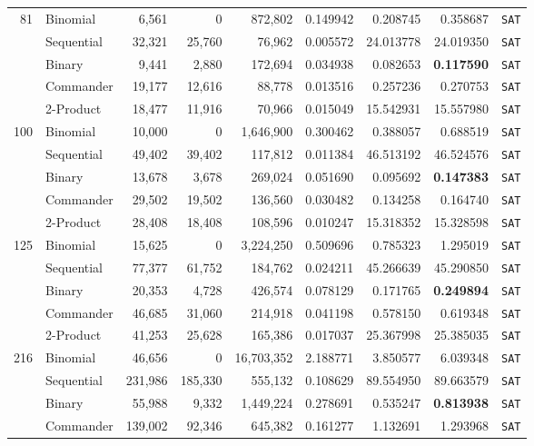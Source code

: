 \documentclass[a4paper,fleqn]{cas-sc}
\begin{document}
\begin{table}[t]
\begin{tabular*}{\textwidth}{@{\extracolsep{\fill}} r l r r r r r r c @{}}
\midrule
\multirow{5}{*}{81} 
 & Binomial & 6,561 & 0 & 872,802 & 0.149942 & 0.208745 & 0.358687 & \texttt{SAT} \\
 & Sequential & 32,321 & 25,760 & 76,962 & 0.005572 & 24.013778 & 24.019350 & \texttt{SAT} \\
 & Binary & 9,441 & 2,880 & 172,694 & 0.034938 & 0.082653 & \textbf{0.117590} & \texttt{SAT} \\
 & Commander & 19,177 & 12,616 & 88,778 & 0.013516 & 0.257236 & 0.270753 & \texttt{SAT} \\
 & 2-Product & 18,477 & 11,916 & 70,966 & 0.015049 & 15.542931 & 15.557980 & \texttt{SAT} \\
\midrule
\multirow{5}{*}{100} 
 & Binomial & 10,000 & 0 & 1,646,900 & 0.300462 & 0.388057 & 0.688519 & \texttt{SAT} \\
 & Sequential & 49,402 & 39,402 & 117,812 & 0.011384 & 46.513192 & 46.524576 & \texttt{SAT} \\
 & Binary & 13,678 & 3,678 & 269,024 & 0.051690 & 0.095692 & \textbf{0.147383} & \texttt{SAT} \\
 & Commander & 29,502 & 19,502 & 136,560 & 0.030482 & 0.134258 & 0.164740 & \texttt{SAT} \\
 & 2-Product & 28,408 & 18,408 & 108,596 & 0.010247 & 15.318352 & 15.328598 & \texttt{SAT} \\
\midrule
\multirow{5}{*}{125} 
 & Binomial & 15,625 & 0 & 3,224,250 & 0.509696 & 0.785323 & 1.295019 & \texttt{SAT} \\
 & Sequential & 77,377 & 61,752 & 184,762 & 0.024211 & 45.266639 & 45.290850 & \texttt{SAT} \\
 & Binary & 20,353 & 4,728 & 426,574 & 0.078129 & 0.171765 & \textbf{0.249894} & \texttt{SAT} \\
 & Commander & 46,685 & 31,060 & 214,918 & 0.041198 & 0.578150 & 0.619348 & \texttt{SAT} \\
 & 2-Product & 41,253 & 25,628 & 165,386 & 0.017037 & 25.367998 & 25.385035 & \texttt{SAT} \\
\midrule
\multirow{5}{*}{216} 
 & Binomial & 46,656 & 0 & 16,703,352 & 2.188771 & 3.850577 & 6.039348 & \texttt{SAT} \\
 & Sequential & 231,986 & 185,330 & 555,132 & 0.108629 & 89.554950 & 89.663579 & \texttt{SAT} \\
 & Binary & 55,988 & 9,332 & 1,449,224 & 0.278691 & 0.535247 & \textbf{0.813938} & \texttt{SAT} \\
 & Commander & 139,002 & 92,346 & 645,382 & 0.161277 & 1.132691 & 1.293968 & \texttt{SAT} \\

\end{tabular*}
\end{table}
\end{document}
